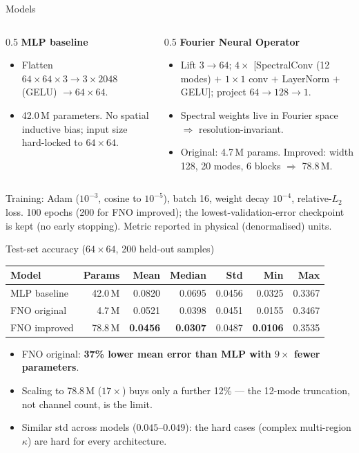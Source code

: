 \documentclass[aspectratio=169,11pt]{beamer}
\begin{document}
\begin{frame}{Models}
\begin{columns}
\begin{column}{0.5\textwidth}
\textbf{MLP baseline}
\begin{itemize}\footnotesize
  \item Flatten $64{\times}64{\times}3 \to 3{\times}2048$ (GELU) $\to 64{\times}64$.
  \item 42.0\,M parameters. No spatial inductive bias; input size hard-locked to $64\times64$.
\end{itemize}
\end{column}
\begin{column}{0.5\textwidth}
\textbf{Fourier Neural Operator}
\begin{itemize}\footnotesize
  \item Lift $3\to64$; $4\times$ [SpectralConv (12 modes) $+$ $1\times1$ conv $+$ LayerNorm $+$ GELU]; project $64\to128\to1$.
  \item Spectral weights live in Fourier space $\Rightarrow$ resolution-invariant.
  \item Original: 4.7\,M params. Improved: width 128, 20 modes, 6 blocks $\Rightarrow$ 78.8\,M.
\end{itemize}
\end{column}
\end{columns}
\vfill
\footnotesize Training: Adam ($10^{-3}$, cosine to $10^{-5}$), batch 16, weight decay $10^{-4}$, relative-$L_2$ loss. 100 epochs (200 for FNO improved); the lowest-validation-error checkpoint is kept (no early stopping). Metric reported in physical (denormalised) units.
\end{frame}

\begin{frame}{Test-set accuracy ($64\times64$, 200 held-out samples)}
\centering
\begin{table}
\begin{tabular}{lrrrrrr}
\toprule
Model & Params & Mean & Median & Std & Min & Max \\
\midrule
MLP baseline & 42.0\,M & 0.0820 & 0.0695 & 0.0456 & 0.0325 & 0.3367 \\
FNO original &  4.7\,M & 0.0521 & 0.0398 & 0.0451 & 0.0155 & 0.3467 \\
FNO improved & 78.8\,M & \textbf{0.0456} & \textbf{0.0307} & 0.0487 & \textbf{0.0106} & 0.3535 \\
\bottomrule
\end{tabular}
\end{table}
\vfill
\begin{itemize}\footnotesize
  \item FNO original: \textbf{37\% lower mean error than MLP with $9\times$ fewer parameters}.
  \item Scaling to 78.8\,M ($17\times$) buys only a further 12\% --- the 12-mode truncation, not channel count, is the limit.
  \item Similar std across models ($0.045$--$0.049$): the hard cases (complex multi-region $\kappa$) are hard for every architecture.
\end{itemize}
\end{frame}
\end{document}
